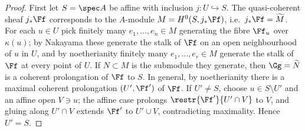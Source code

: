 \begin{proof}
  First let $S = \spec A$ be affine with inclusion $j\colon U\hookrightarrow S$.
  The quasi-coherent sheaf $j_*\Ff$ corresponds to the $A$-module
  $M = H^0(S,j_*\Ff)$, i.e.\ $j_*\Ff = \widetilde M$. For each $u\in U$ pick
  finitely many $e_1,\dots,e_n\in M$ generating the fibre $\Ff_u$ over
  $\kappa(u)$; by Nakayama these generate the stalk of $\Ff$ on an open
  neighbourhood of $u$ in $U$, and by noetherianity finitely many
  $e_1,\dots,e_r\in M$ generate the stalk of $\Ff$ at every point of $U$. If
  $N\subset M$ is the submodule they generate, then $\Gg = \widetilde N$ is a
  coherent prolongation of $\Ff$ to $S$. In general, by noetherianity there is a
  maximal coherent prolongation $(U',\Ff')$ of $\Ff$. If $U'\ne S$, choose
  $u\in S\setminus U'$ and an affine open $V\ni u$; the affine case prolongs
  $\restr{\Ff'}{U'\cap V}$ to $V$, and gluing along $U'\cap V$ extends $\Ff'$ to
  $U'\cup V$, contradicting maximality. Hence $U' = S$.
\end{proof}

